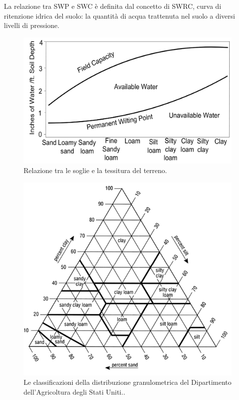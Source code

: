 \documentclass[12pt,a4paper,openright,twoside]{book}
\begin{document}
La relazione tra \ac{SWP} e \ac{SWC} è definita dal concetto di \ac{SWRC}, curva di ritenzione idrica del suolo: la quantità di acqua trattenuta nel suolo a diversi livelli di pressione\cite{assouline1998water}.
\begin{figure}
    \centering
    \includegraphics[width=0.5\linewidth]{./figures/SWC-costants-in-different-soils.png}
    \caption{Relazione tra le soglie e la tessitura del terreno\cite{Ding2022}.}
    \label{fig.SWC-costants-in-different-soils}
\end{figure}
\begin{figure}
    \centering
    \includegraphics[width=0.8\linewidth]{./figures/soil-texture.png}
    \caption{Le classificazioni della distribuzione granulometrica del Dipartimento dell'Agricoltura degli Stati Uniti.\cite{RAI2017505}.}
    \label{fig.soil-texture}
\end{figure}
\end{document}
